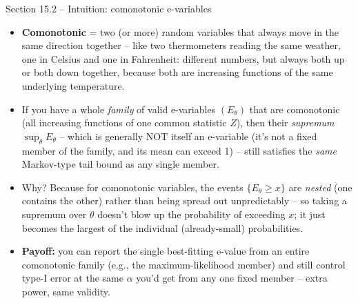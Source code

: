 \documentclass[aspectratio=169,10pt]{beamer}
\begin{document}
\begin{frame}{Section 15.2 -- Intuition: comonotonic e-variables}
  \begin{itemize}
    \item \textbf{Comonotonic} = two (or more) random variables that always move in the same direction together -- like two thermometers reading the same weather, one in Celsius and one in Fahrenheit: different numbers, but always both up or both down together, because both are increasing functions of the same underlying temperature.
    \item If you have a whole \emph{family} of valid e-variables $(E_\theta)$ that are comonotonic (all increasing functions of one common statistic $Z$), then their \emph{supremum} $\sup_\theta E_\theta$ -- which is generally NOT itself an e-variable (it's not a fixed member of the family, and its mean can exceed 1) -- still satisfies the \emph{same} Markov-type tail bound as any single member.
    \item Why? Because for comonotonic variables, the events $\{E_\theta\ge x\}$ are \emph{nested} (one contains the other) rather than being spread out unpredictably -- so taking a supremum over $\theta$ doesn't blow up the probability of exceeding $x$; it just becomes the largest of the individual (already-small) probabilities.
    \item \textbf{Payoff:} you can report the single best-fitting e-value from an entire comonotonic family (e.g., the maximum-likelihood member) and still control type-I error at the same $\alpha$ you'd get from any one fixed member -- extra power, same validity.
  \end{itemize}
\end{frame}
\end{document}
